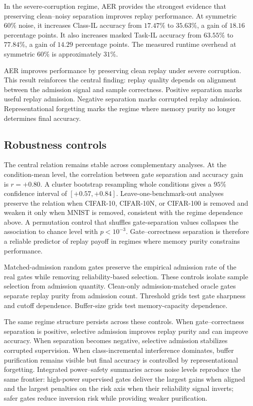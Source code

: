 \documentclass[preprint,12pt]{elsarticle}
\begin{document}
In the severe-corruption regime, AER provides the strongest evidence that preserving clean--noisy separation improves replay performance. At symmetric $60\%$ noise, it increases Class-IL accuracy from $17.47\%$ to $35.63\%$, a gain of $18.16$ percentage points. It also increases masked Task-IL accuracy from $63.55\%$ to $77.84\%$, a gain of $14.29$ percentage points. The measured runtime overhead at symmetric $60\%$ is approximately $31\%$.

AER improves performance by preserving clean replay under severe corruption. This result reinforces the central finding: replay quality depends on alignment between the admission signal and sample correctness. Positive separation marks useful replay admission. Negative separation marks corrupted replay admission. Representational forgetting marks the regime where memory purity no longer determines final accuracy.

\subsection{Robustness controls}

The central relation remains stable across complementary analyses. At the condition-mean level, the correlation between gate separation and accuracy gain is $r=+0.80$. A cluster bootstrap resampling whole conditions gives a $95\%$ confidence interval of $[+0.57,+0.84]$. Leave-one-benchmark-out analyses preserve the relation when CIFAR-10, CIFAR-10N, or CIFAR-100 is removed and weaken it only when MNIST is removed, consistent with the regime dependence above. A permutation control that shuffles gate-separation values collapses the association to chance level with $p<10^{-3}$. Gate--correctness separation is therefore a reliable predictor of replay payoff in regimes where memory purity constrains performance.

Matched-admission random gates preserve the empirical admission rate of the real gates while removing reliability-based selection. These controls isolate sample selection from admission quantity. Clean-only admission-matched oracle gates separate replay purity from admission count. Threshold grids test gate sharpness and cutoff dependence. Buffer-size grids test memory-capacity dependence.

The same regime structure persists across these controls. When gate--correctness separation is positive, selective admission improves replay purity and can improve accuracy. When separation becomes negative, selective admission stabilizes corrupted supervision. When class-incremental interference dominates, buffer purification remains visible but final accuracy is controlled by representational forgetting. Integrated power--safety summaries across noise levels reproduce the same frontier: high-power supervised gates deliver the largest gains when aligned and the largest penalties on the risk axis when their reliability signal inverts; safer gates reduce inversion risk while providing weaker purification.
\end{document}
